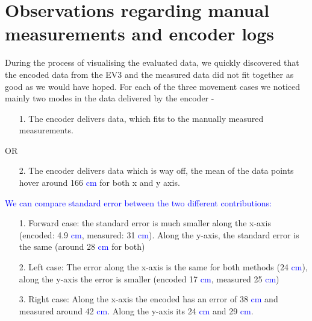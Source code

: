     \section{Observations regarding manual measurements and encoder logs}
    
    During the process of visualising the evaluated data, we quickly discovered that the encoded data from the EV3 and the measured data did not fit together as good as we would have hoped. For each of the three movement cases we noticed mainly two modes in the data delivered by the encoder -
    
    \begin{itemize}
        \item[1.] The encoder delivers data, which fits to the manually measured measurements.
    
    \end{itemize}
    
    \begin{center}
        OR
    \end{center}
        
    \begin{itemize}
        \item[2.] The encoder delivers data which is way off, the mean of the data points hover around 166 \textcolor{blue}{cm} for both x and y axis.
    \end{itemize}
    
    \textcolor{blue}{We can compare standard error between the two different contributions:}
    
     \begin{itemize}
        \item[1.] Forward case: the standard error is much smaller along the x-axis (encoded: 4.9 \textcolor{blue}{cm}, measured: 31 \textcolor{blue}{cm}). Along the y-axis, the standard error is the same (around 28 \textcolor{blue}{cm} for both)
        \item[2.] Left case: The error along the x-axis is the same for  both methods (24 \textcolor{blue}{cm}), along the y-axis the error is smaller (encoded 17 \textcolor{blue}{cm}, measured 25 \textcolor{blue}{cm})
        \item[3.] Right case: Along the x-axis the encoded has an error  of 38 \textcolor{blue}{cm} and measured around 42 \textcolor{blue}{cm}. Along the y-axis its 24  \textcolor{blue}{cm} and 29 \textcolor{blue}{cm}.
    \end{itemize}
    
